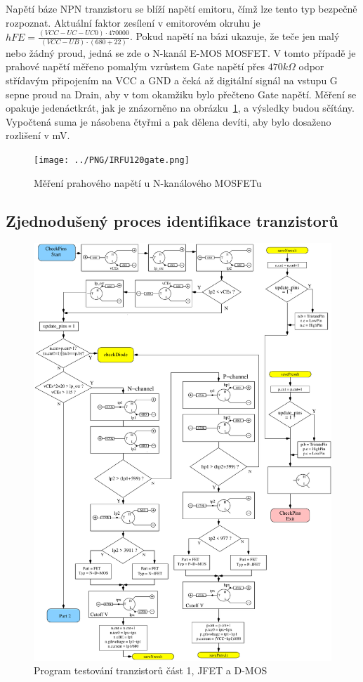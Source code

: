 Napětí báze NPN tranzistoru se blíží napětí emitoru, čímž lze tento typ bezpečně rozpoznat.
Aktuální faktor zesílení v emitorovém okruhu je 
\(hFE = \frac{(VCC-UC-UC0)\cdot 470000}{(VCC-UB)\cdot (680+22)}\).
Pokud napětí na bázi ukazuje, že teče jen malý nebo žádný proud, jedná se zde o N-kanál E-MOS MOSFET.
V tomto případě je prahové napětí měřeno pomalým vzrůstem Gate napětí přes \(470k\Omega\) odpor střídavým připojením na VCC a GND a čeká až digitální signál na vstupu G sepne proud na Drain, aby v tom okamžiku bylo přečteno Gate napětí.
Měření se opakuje jedenáctkrát, jak je znázorněno na obrázku~\ref{fig:eleven}, a výsledky budou sčítány.
Vypočtená suma je násobena čtyřmi a pak dělena devíti, aby bylo dosaženo rozlišení v mV.

\begin{figure}[H]
\centering
\texttt{[image: ../PNG/IRFU120gate.png]}
\caption{Měření prahového napětí u N-kanálového MOSFETu}
\label{fig:eleven}
\end{figure}

\subsection{Zjednodušený proces identifikace tranzistorů}

\begin{figure}[H]
\centering
\includegraphics[width=.8\textwidth]{../FIG/CheckSemi1.pdf}
\caption{Program testování tranzistorů část 1, JFET a D-MOS}
\label{fig:ChkSemi1}
\end{figure}

